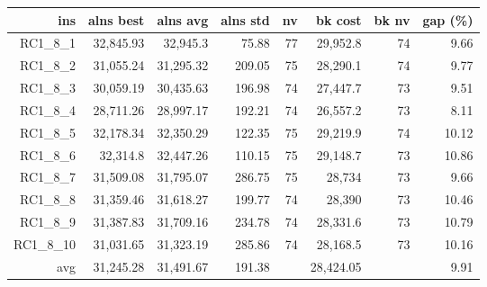   \begin{table}[caption={Kết quả đo với tập HG\_RC\_1\_8 800 yêu cầu}, label=exp:HGRC18]
    \centering
    \begin{tabular}{rrrrrrrr}
    \hline
    ins & alns best & alns avg & alns std & nv & bk cost & bk nv & gap (\%) \\ \hline
    RC1\_8\_1 & 32,845.93 & 32,945.3 & 75.88 & 77 & 29,952.8 & 74 & 9.66 \\ \hline
    RC1\_8\_2 & 31,055.24 & 31,295.32 & 209.05 & 75 & 28,290.1 & 74 & 9.77 \\ \hline
    RC1\_8\_3 & 30,059.19 & 30,435.63 & 196.98 & 74 & 27,447.7 & 73 & 9.51 \\ \hline
    RC1\_8\_4 & 28,711.26 & 28,997.17 & 192.21 & 74 & 26,557.2 & 73 & 8.11 \\ \hline
    RC1\_8\_5 & 32,178.34 & 32,350.29 & 122.35 & 75 & 29,219.9 & 74 & 10.12 \\ \hline
    RC1\_8\_6 & 32,314.8 & 32,447.26 & 110.15 & 75 & 29,148.7 & 73 & 10.86 \\ \hline
    RC1\_8\_7 & 31,509.08 & 31,795.07 & 286.75 & 75 & 28,734 & 73 & 9.66 \\ \hline
    RC1\_8\_8 & 31,359.46 & 31,618.27 & 199.77 & 74 & 28,390 & 73 & 10.46 \\ \hline
    RC1\_8\_9 & 31,387.83 & 31,709.16 & 234.78 & 74 & 28,331.6 & 73 & 10.79 \\ \hline
    RC1\_8\_10 & 31,031.65 & 31,323.19 & 285.86 & 74 & 28,168.5 & 73 & 10.16 \\ \hline
    avg & 31,245.28 & 31,491.67 & 191.38 & & 28,424.05 & & 9.91 \\ \hline
    \end{tabular}
  \end{table}

